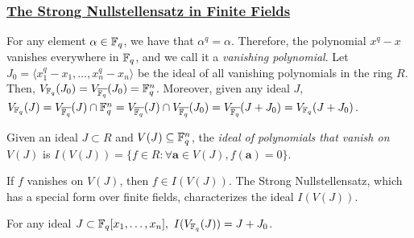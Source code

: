 \subsubsection{\underline{The Strong Nullstellensatz in Finite Fields}}

For any element $\alpha\in{\mathbb{F}}_{q}$, we have that
$\alpha^q=\alpha$. Therefore, the polynomial $x^q-x$ vanishes
everywhere in ${\mathbb{F}}_{q}$, and we call it a {\it vanishing polynomial}. Let
$J_0 = \langle x_1^q-x_1,\dots,x_n^q-x_n\rangle$ be the ideal of all
vanishing polynomials in the ring $R$. Then, $V_{{\mathbb{F}}_{q}}(J_0) =
V_{{\overline{{\mathbb{F}}_q}}}(J_0) = {\mathbb{F}}_{q}^n$. Moreover, given any ideal $J$, $V_{{\mathbb{F}}_{q}}(J) =
V_{{\overline{{\mathbb{F}}_q}}}(J) \cap{\mathbb{F}}_{q}^n = V_{{\overline{{\mathbb{F}}_q}}}(J) \cap V_{{\overline{{\mathbb{F}}_q}}}(J_0) =
V_{{\overline{{\mathbb{F}}_q}}}(J+J_0) = V_{{\mathbb{F}}_{q}}(J+J_0)$. 


\begin{Definition}
Given an ideal $J\subset R$ and $V(J) \subseteq {\mathbb{F}}_{q}^n$, the {\it ideal
of polynomials that vanish on} $V(J)$ is $I(V(J)) = \{ f \in R :
\forall \bm{a} \in V(J), f(\bm{a}) = 0\}$.
\end{Definition}

If $f$ vanishes on $V(J)$, then $f \in I(V(J))$. The Strong
Nullstellensatz, which has a special form over finite fields,
characterizes the ideal $I(V(J))$.

\begin{Theorem} \label{thm:strong-ns}  
For any ideal $J \subset {\mathbb{F}}_{q}[x_1,\dots,x_n], ~I(V_{{\mathbb{F}}_{q}}(J)) = J + J_0$.
\end{Theorem}



